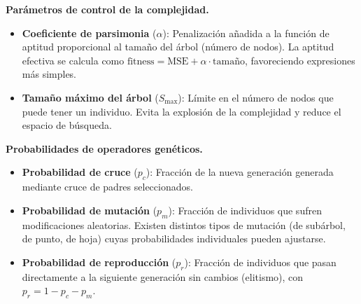 \documentclass[12pt,a4paper]{article}
\begin{document}
\textbf{Parámetros de control de la complejidad.}
\begin{itemize}
    \item \textbf{Coeficiente de parsimonia} (\(\alpha\)): Penalización añadida a la función de aptitud proporcional al tamaño del árbol (número de nodos). La aptitud efectiva se calcula como \(\text{fitness} = \text{MSE} + \alpha \cdot \text{tamaño}\), favoreciendo expresiones más simples.
    \item \textbf{Tamaño máximo del árbol} (\(S_{\max}\)): Límite en el número de nodos que puede tener un individuo. Evita la explosión de la complejidad y reduce el espacio de búsqueda.
\end{itemize}

\textbf{Probabilidades de operadores genéticos.}
\begin{itemize}
    \item \textbf{Probabilidad de cruce} (\(p_c\)): Fracción de la nueva generación generada mediante cruce de padres seleccionados.
    \item \textbf{Probabilidad de mutación} (\(p_m\)): Fracción de individuos que sufren modificaciones aleatorias. Existen distintos tipos de mutación (de subárbol, de punto, de hoja) cuyas probabilidades individuales pueden ajustarse.
    \item \textbf{Probabilidad de reproducción} (\(p_r\)): Fracción de individuos que pasan directamente a la siguiente generación sin cambios (elitismo), con \(p_r = 1 - p_c - p_m\).
\end{itemize}

\newpage


\end{document}
